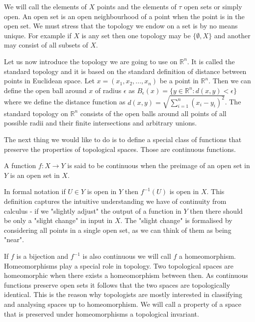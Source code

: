 We will call the elements of $X$ points and the elements of $\tau$ open sets or simply open. An open set is an open neighbourhood of a point when the point is in the open set. We must stress that the topology we endow on a set is by no means unique. For example if $X$ is any set then one topology may be $\{\emptyset, X\}$ and another may consist of all subsets of $X$.

Let us now introduce the topology we are going to use on $\mathbb{R}^n$. It is called the standard topology and it is based on the standard definition of distance between points in Euclidean space. Let $x = (x_1, x_2, ..., x_n)$ be a point in $\mathbb{R}^n$. Then we can define the open ball around $x$ of radius $\epsilon$ as $B_\epsilon(x) = \{y \in \mathbb{R}^n: d(x, y) < \epsilon\}$ where we define the distance function as $d(x, y) = \sqrt{\sum_{i=1}^n{(x_i - y_i)^2}}$. The standard topology on $\mathbb{R}^n$ consists of the open balls around all points of all possible radii and their finite intersections and arbitrary unions.


The next thing we would like to do is to define a special class of functions that preserve the properties of topological spaces. Those are continuous functions.

\begin{defn} A function $f : X \to Y$ is said to be continuous when the preimage of an open set in $Y$ is an open set in $X$. \end{defn}

In formal notation if $U \in Y$ is open in $Y$ then $f^{-1}(U)$ is open in $X$. This definition captures the intuitive understanding we have of continuity from calculus - if we "slightly adjust" the output of a function in $Y$ then there should be only a "slight change" in input in $X$. The "slight change" is formalised by considering all points in a single open set, as we can think of them as being "near".

If $f$ is a bijection and $f^{-1}$ is also continuous we will call $f$ a homeomorphism. Homeomorphisms play a special role in topology. Two topological spaces are homeomorphic when there exists a homeomorphism between then. As continuous functions preserve open sets it follows that the two spaces are topologically identical. This is the reason why topologists are mostly interested in classifying and analysing spaces up to homeomorphism. We will call a property of a space that is preserved under homeomorphisms a topological invariant.

